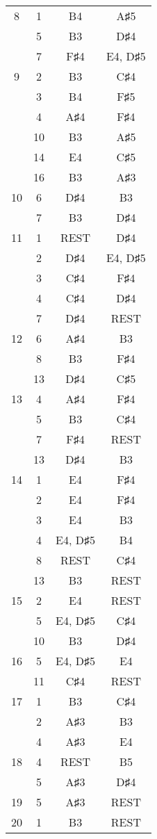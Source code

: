 \documentclass{article}
\begin{document}
\begin{longtable}{|c|c|c|c|}
\hline
8 & 1 & B4 & A♯5 \\ 
  & 5 & B3 & D♯4 \\ 
  & 7 & F♯4 & E4, D♯5 \\ 
\hline
9 & 2 & B3 & C♯4 \\ 
  & 3 & B4 & F♯5 \\ 
  & 4 & A♯4 & F♯4 \\ 
  & 10 & B3 & A♯5 \\ 
  & 14 & E4 & C♯5 \\ 
  & 16 & B3 & A♯3 \\ 
\hline
10 & 6 & D♯4 & B3 \\ 
  & 7 & B3 & D♯4 \\ 
\hline
11 & 1 & REST & D♯4 \\ 
  & 2 & D♯4 & E4, D♯5 \\ 
  & 3 & C♯4 & F♯4 \\ 
  & 4 & C♯4 & D♯4 \\ 
  & 7 & D♯4 & REST \\ 
\hline
12 & 6 & A♯4 & B3 \\ 
  & 8 & B3 & F♯4 \\ 
  & 13 & D♯4 & C♯5 \\ 
\hline
13 & 4 & A♯4 & F♯4 \\ 
  & 5 & B3 & C♯4 \\ 
  & 7 & F♯4 & REST \\ 
  & 13 & D♯4 & B3 \\ 
\hline
14 & 1 & E4 & F♯4 \\ 
  & 2 & E4 & F♯4 \\ 
  & 3 & E4 & B3 \\ 
  & 4 & E4, D♯5 & B4 \\ 
  & 8 & REST & C♯4 \\ 
  & 13 & B3 & REST \\ 
\hline
15 & 2 & E4 & REST \\ 
  & 5 & E4, D♯5 & C♯4 \\ 
  & 10 & B3 & D♯4 \\ 
\hline
16 & 5 & E4, D♯5 & E4 \\ 
  & 11 & C♯4 & REST \\ 
\hline
17 & 1 & B3 & C♯4 \\ 
  & 2 & A♯3 & B3 \\ 
  & 4 & A♯3 & E4 \\ 
\hline
18 & 4 & REST & B5 \\ 
  & 5 & A♯3 & D♯4 \\ 
\hline
19 & 5 & A♯3 & REST \\ 
\hline
20 & 1 & B3 & REST \\ 

\end{longtable}
\end{document}
